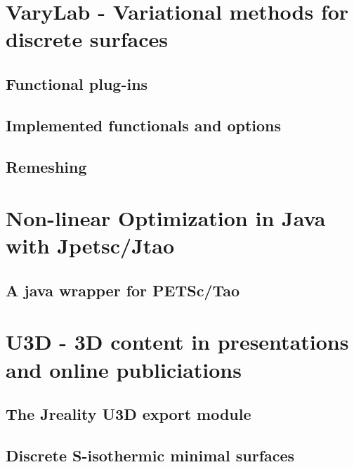 

\chapter{{\sc VaryLab} - Variational methods for discrete surfaces}
\label{sec:varylab}
\section{Functional plug-ins}
\section{Implemented functionals and options}
\section{Remeshing}



\chapter{Non-linear Optimization in {\sc Java} with {\sc Jpetsc/Jtao}}
\label{sec:jpetsctao}

\section{A java wrapper for {\sc PETSc/Tao}}

\chapter{{\sc U3D} - 3D content in presentations and online publiciations}
\label{sec:u3d}
\section{The {\sc Jreality} U3D export module}
\section{Discrete S-isothermic minimal surfaces}

